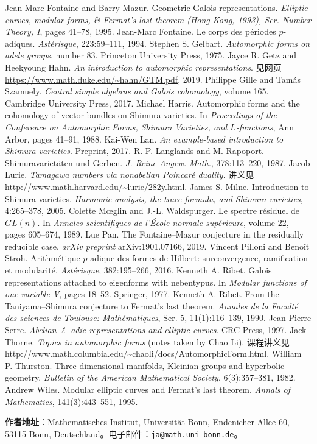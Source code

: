 \begin{references}
 Jean-Marc Fontaine and Barry Mazur. Geometric Galois representations. \emph{Elliptic curves, modular forms, \& Fermat's last theorem (Hong Kong, 1993), Ser. Number Theory, I}, pages 41--78, 1995.
 Jean-Marc Fontaine. Le corps des périodes $p$-adiques. \emph{Astérisque}, 223:59--111, 1994.
 Stephen S. Gelbart. \emph{Automorphic forms on adele groups}, number 83. Princeton University Press, 1975.
 Jayce R. Getz and Heekyoung Hahn. \emph{An introduction to automorphic representations}. 见网页 \url{https://www.math.duke.edu/~hahn/GTM.pdf}, 2019.
 Philippe Gille and Tamás Szamuely. \emph{Central simple algebras and Galois cohomology}, volume 165. Cambridge University Press, 2017.
 Michael Harris. Automorphic forms and the cohomology of vector bundles on Shimura varieties. In \emph{Proceedings of the Conference on Automorphic Forms, Shimura Varieties, and $L$-functions}, Ann Arbor, pages 41--91, 1988.
 Kai-Wen Lan. \emph{An example-based introduction to Shimura varieties}. Preprint, 2017.
 R. P. Langlands and M. Rapoport. Shimuravarietäten und Gerben. \emph{J. Reine Angew. Math.}, 378:113--220, 1987.
 Jacob Lurie. \emph{Tamagawa numbers via nonabelian Poincaré duality}. 讲义见 \url{http://www.math.harvard.edu/~lurie/282y.html}.
 James S. Milne. Introduction to Shimura varieties. \emph{Harmonic analysis, the trace formula, and Shimura varieties}, 4:265--378, 2005.
 Colette Mœglin and J.-L. Waldspurger. Le spectre résiduel de $GL(n)$. In \emph{Annales scientifiques de l'École normale supérieure}, volume 22, pages 605--674, 1989.
 Lue Pan. The Fontaine--Mazur conjecture in the residually reducible case. \emph{arXiv preprint} arXiv:1901.07166, 2019.
 Vincent Pilloni and Benoît Stroh. Arithmétique $p$-adique des formes de Hilbert: surconvergence, ramification et modularité. \emph{Astérisque}, 382:195--266, 2016.
 Kenneth A. Ribet. Galois representations attached to eigenforms with nebentypus. In \emph{Modular functions of one variable V}, pages 18--52. Springer, 1977.
 Kenneth A. Ribet. From the Taniyama--Shimura conjecture to Fermat's last theorem. \emph{Annales de la Faculté des sciences de Toulouse: Mathématiques}, Ser. 5, 11(1):116--139, 1990.
 Jean-Pierre Serre. \emph{Abelian $\ell$-adic representations and elliptic curves}. CRC Press, 1997.
 Jack Thorne. \emph{Topics in automorphic forms} (notes taken by Chao Li). 课程讲义见 \url{http://www.math.columbia.edu/~chaoli/docs/AutomorphicForm.html}.
 William P. Thurston. Three dimensional manifolds, Kleinian groups and hyperbolic geometry. \emph{Bulletin of the American Mathematical Society}, 6(3):357--381, 1982.
 Andrew Wiles. Modular elliptic curves and Fermat's last theorem. \emph{Annals of Mathematics}, 141(3):443--551, 1995.
\end{references}

\vspace{2em}
\noindent\textbf{作者地址}：Mathematisches Institut, Universität Bonn, Endenicher Allee 60, 53115 Bonn, Deutschland。电子邮件：\texttt{ja@math.uni-bonn.de}。
